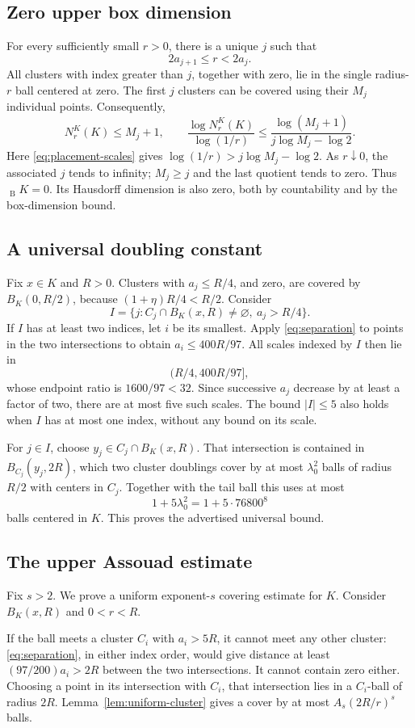 \documentclass[11pt]{article}
\theoremstyle{remark}
\newcommand{\dimB}{\mathop{\overline{\dim}}\nolimits_{\mathrm B}}
\begin{document}
\subsection{Zero upper box dimension}
For every sufficiently small $r>0$, there is a unique $j$ such that
\[
 2a_{j+1}\le r<2a_j.
\]
All clusters with index greater than $j$, together with zero, lie in the single radius-$r$ ball centered at zero. The first $j$ clusters can be covered using their $M_j$ individual points. Consequently,
\[
 N_r^K(K)\le M_j+1,
 \qquad
 \frac{\log N_r^K(K)}{\log(1/r)}
 \le\frac{\log(M_j+1)}{j\log M_j-\log2}.
\]
Here \eqref{eq:placement-scales} gives $\log(1/r)>j\log M_j-\log2$. As $r\downarrow0$, the associated $j$ tends to infinity; $M_j\ge j$ and the last quotient tends to zero. Thus $\dimB K=0$. Its Hausdorff dimension is also zero, both by countability and by the box-dimension bound.

\subsection{A universal doubling constant}
Fix $x\in K$ and $R>0$. Clusters with $a_j\le R/4$, and zero, are covered by $B_K(0,R/2)$, because $(1+\eta)R/4<R/2$. Consider
\[
 I=\{j:C_j\cap B_K(x,R)\ne\varnothing,\ a_j>R/4\}.
\]
If $I$ has at least two indices, let $i$ be its smallest. Apply \eqref{eq:separation} to points in the two intersections to obtain $a_i\le400R/97$. All scales indexed by $I$ then lie in
\[
 (R/4,400R/97],
\]
whose endpoint ratio is $1600/97<32$. Since successive $a_j$ decrease by at least a factor of two, there are at most five such scales. The bound $|I|\le5$ also holds when $I$ has at most one index, without any bound on its scale.

For $j\in I$, choose $y_j\in C_j\cap B_K(x,R)$. That intersection is contained in $B_{C_j}(y_j,2R)$, which two cluster doublings cover by at most $\lambda_0^2$ balls of radius $R/2$ with centers in $C_j$. Together with the tail ball this uses at most
\[
 1+5\lambda_0^2=1+5\cdot76800^8
\]
balls centered in $K$. This proves the advertised universal bound.

\subsection{The upper Assouad estimate}
Fix $s>2$. We prove a uniform exponent-$s$ covering estimate for $K$. Consider $B_K(x,R)$ and $0<r<R$.

If the ball meets a cluster $C_i$ with $a_i>5R$, it cannot meet any other cluster: \eqref{eq:separation}, in either index order, would give distance at least $(97/200)a_i>2R$ between the two intersections. It cannot contain zero either. Choosing a point in its intersection with $C_i$, that intersection lies in a $C_i$-ball of radius $2R$. Lemma~\ref{lem:uniform-cluster} gives a cover by at most $A_s(2R/r)^s$ balls.
\end{document}
